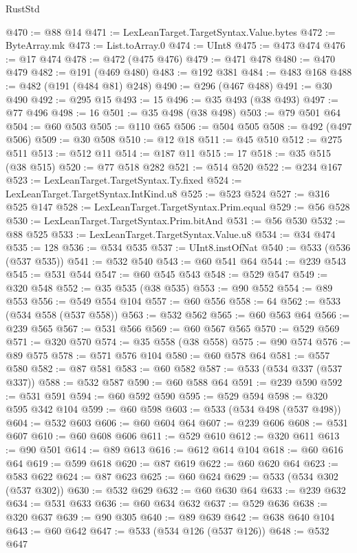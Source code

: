\begin{lexlean}{RustStd}
\begin{coremodule}
@470 := @88 @14
@471 := LexLeanTarget.TargetSyntax.Value.bytes
@472 := ByteArray.mk
@473 := List.toArray.{0}
@474 := UInt8
@475 := @473 @474
@476 := @17 @474
@478 := @472 (@475 @476)
@479 := @471 @478
@480 := @470 @479
@482 := @191 (@469 @480)
@483 := @192 @381
@484 := @483 @168
@488 := @482 (@191 (@484 @81) @248)
@490 := @296 (@467 @488)
@491 := @30 @490
@492 := @295 @15
@493 := 15
@496 := @35 @493 (@38 @493)
@497 := @77 @496
@498 := 16
@501 := @35 @498 (@38 @498)
@503 := @79 @501 @64
@504 := @60 @503
@505 := @110 @65
@506 := @504 @505
@508 := @492 (@497 @506)
@509 := @30 @508
@510 := @12 @18
@511 := @45 @510
@512 := @275 @511
@513 := @512 @11
@514 := @187 @11
@515 := 17
@518 := @35 @515 (@38 @515)
@520 := @77 @518 @282
@521 := @514 @520
@522 := @234 @167
@523 := LexLeanTarget.TargetSyntax.Ty.fixed
@524 := LexLeanTarget.TargetSyntax.IntKind.u8
@525 := @523 @524
@527 := @316 @525 @147
@528 := LexLeanTarget.TargetSyntax.Prim.equal
@529 := @56 @528
@530 := LexLeanTarget.TargetSyntax.Prim.bitAnd
@531 := @56 @530
@532 := @88 @525
@533 := LexLeanTarget.TargetSyntax.Value.u8
@534 := @34 @474
@535 := 128
@536 := @534 @535
@537 := UInt8.instOfNat
@540 := @533 (@536 (@537 @535))
@541 := @532 @540
@543 := @60 @541 @64
@544 := @239 @543
@545 := @531 @544
@547 := @60 @545 @543
@548 := @529 @547
@549 := @320 @548
@552 := @35 @535 (@38 @535)
@553 := @90 @552
@554 := @89 @553
@556 := @549 @554 @104
@557 := @60 @556
@558 := 64
@562 := @533 (@534 @558 (@537 @558))
@563 := @532 @562
@565 := @60 @563 @64
@566 := @239 @565
@567 := @531 @566
@569 := @60 @567 @565
@570 := @529 @569
@571 := @320 @570
@574 := @35 @558 (@38 @558)
@575 := @90 @574
@576 := @89 @575
@578 := @571 @576 @104
@580 := @60 @578 @64
@581 := @557 @580
@582 := @87 @581
@583 := @60 @582
@587 := @533 (@534 @337 (@537 @337))
@588 := @532 @587
@590 := @60 @588 @64
@591 := @239 @590
@592 := @531 @591
@594 := @60 @592 @590
@595 := @529 @594
@598 := @320 @595 @342 @104
@599 := @60 @598
@603 := @533 (@534 @498 (@537 @498))
@604 := @532 @603
@606 := @60 @604 @64
@607 := @239 @606
@608 := @531 @607
@610 := @60 @608 @606
@611 := @529 @610
@612 := @320 @611
@613 := @90 @501
@614 := @89 @613
@616 := @612 @614 @104
@618 := @60 @616 @64
@619 := @599 @618
@620 := @87 @619
@622 := @60 @620 @64
@623 := @583 @622
@624 := @87 @623
@625 := @60 @624
@629 := @533 (@534 @302 (@537 @302))
@630 := @532 @629
@632 := @60 @630 @64
@633 := @239 @632
@634 := @531 @633
@636 := @60 @634 @632
@637 := @529 @636
@638 := @320 @637
@639 := @90 @305
@640 := @89 @639
@642 := @638 @640 @104
@643 := @60 @642
@647 := @533 (@534 @126 (@537 @126))
@648 := @532 @647

\end{coremodule}
\end{lexlean}
